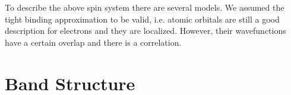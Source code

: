 \documentclass[a4paper,10pt]{report}
\begin{document}
To describe the above spin system there are several models. We assumed the tight binding approximation to be valid, i.e. atomic orbitals
are still a good description for electrons and they are localized. However, their wavefunctions have a certain overlap and there is a correlation. 




\begin{comment}

However, since electrons with opposite spin can occupy the same state and repell each other, this might have to be taken into account, depending on the 
strength of the correlation in such a situation. 
This can be done in the Hubbard model, given by
\begin{equation}
 \hat{H} = \underbrace{U \sum_i c^{\dagger}_{i,\uparrow}c_{i,\uparrow} c^{\dagger}_{i,\downarrow}c_{i,\downarrow} }_{\text{correlation}}
	    -\underbrace{t \sum_{<i,j>,\sigma} c^{\dagger}_{i,\sigma}c_{j,\sigma} + c^{\dagger}_{j,\sigma}c_{i,\sigma} }_{\text{hopping term}}
\end{equation}
with the creation operator 
\begin{equation}
 c^{\dagger}_{i} = \euler^{-\im\pi \sum_{j<i} a^{\dagger}_j a_j } a^{\dagger}_i\quad ; \quad a^{\dagger}_i = \frac12 \left( \sigma^x_i + \im \sigma^y \right)
\end{equation}
and the corresponding annihilation operator. 
 this kind of creation operator phase correction is only needed when derived from the Heisenberg model, see Quantum Many Particle Systems by Negele
In certain situations the Heisenberg model can be derived from the Hubbard model. 

\end{comment}



\section{Band Structure}
\end{document}
